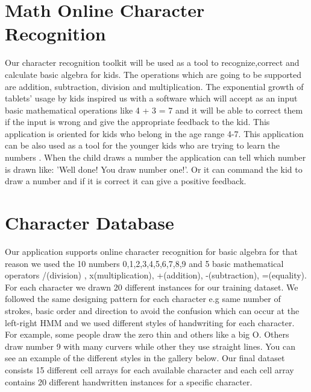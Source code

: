 \documentclass[a4paper, 10pt]{article}
\begin{document}
\section{Math Online Character Recognition}
Our character recognition toolkit will be used as a tool to recognize,correct and calculate basic algebra for kids. The operations which are going to be supported are addition, subtraction, division and multiplication. The exponential growth of tablets' usage by kids inspired us with a software which will accept as an input basic mathematical operations like 4 + 3 = 7 and it will be able to correct them if the input is wrong and give the appropriate feedback to the kid. This application is oriented for kids who belong in the age range 4-7. This application can be also used as a tool for the younger kids who are trying to learn the numbers . When the child draws a number the application can tell which number is drawn like:
'Well done! You draw number one!'. Or it can command the kid to draw a number and if it is correct it can give a positive feedback.


\section{Character Database}
Our application supports online character recognition for basic algebra for that reason we used the 10 numbers 0,1,2,3,4,5,6,7,8,9 and 5 basic mathematical operators /(division) , x(multiplication), +(addition), -(subtraction), =(equality).
For each character we drawn 20 different instances for our training dataset. We followed the same designing pattern for each character e.g same number of strokes, basic order and direction to avoid the confusion which can occur at the left-right HMM and we used different styles of handwriting for each character. For example, some people draw the zero thin and others like a big O. Others draw number 9 with many curvers while other they use straight lines. You can see an example of the different styles in the gallery below. Our final dataset consists 15 different cell arrays for each available character and each cell array contains 20 different handwritten  instances for a specific character. 
\end{document}
